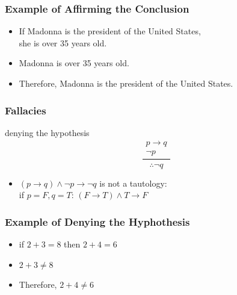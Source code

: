 \documentclass[dvipsnames]{beamer}
\begin{document}
\begin{frame}
  \frametitle{Example of Affirming the Conclusion}

  \begin{example}
    \begin{itemize}
      \item If Madonna is the president of the United States,\\
        she is over 35 years old.
      \item Madonna is over 35 years old.

      \pause
      \medskip
      \item Therefore, Madonna is the president of the United States.
    \end{itemize}
  \end{example}
\end{frame}

\begin{frame}
  \frametitle{Fallacies}

  \begin{block}{denying the hypothesis}
    \[
    \frac
      {
        \begin{array}{c}
          p \rightarrow q\\
          \neg p
        \end{array}
      }
      {
        \therefore \neg q
      }
    \]
  \end{block}

  \pause
  \begin{itemize}
    \item $(p \rightarrow q) \wedge \neg p \rightarrow \neg q$ is not a tautology:\\
      if $p=F,q=T$: $(F \rightarrow T) \wedge T \rightarrow F$
  \end{itemize}
\end{frame}

\begin{frame}
  \frametitle{Example of Denying the Hyphothesis}

  \begin{example}
    \begin{itemize}
      \item if $2+3=8$ then $2+4=6$
      \item $2+3 \neq 8$

      \pause
      \medskip
      \item Therefore, $2+4 \neq 6$
    \end{itemize}
  \end{example}
\end{frame}
\end{document}
